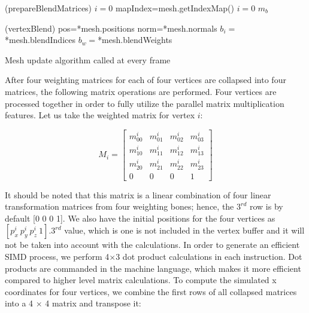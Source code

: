 \begin{algorithm}[ht]
\DontPrintSemicolon %
\function(prepareBlendMatrices){
$i=0$\;
\;
mapIndex=mesh.getIndexMap() 
$i=0$\;
\;
\Return $m_b$\;
}

\function(vertexBlend){
pos=*mesh.positions\;
norm=*mesh.normals\;
$b_i=$*mesh.blendIndices\;
$b_w=$*mesh.blendWeights\;
}
\caption{Mesh update algorithm called at every frame}
\label{algo:updateMesh}
\end{algorithm}

After four weighting matrices for each of four vertices are collapsed into four matrices, the following matrix operations are performed. Four vertices are processed together in order to fully utilize the parallel matrix multiplication features. Let us take the weighted matrix for vertex $i$:

\begin{equation}
M_i=
\begin{bmatrix}
m_{00}^i & m_{01}^i & m_{02}^i & m_{03}^i \\
m_{10}^i & m_{11}^i & m_{12}^i & m_{13}^i \\
m_{20}^i & m_{21}^i & m_{22}^i & m_{23}^i \\
0 & 0 & 0 & 1
\end{bmatrix}
\label{eqn:weighted_matrix_for_i}
\end{equation}

It should be noted that this matrix is a linear combination of four linear transformation matrices from four weighting bones; hence, the $3^{rd}$ row is by default [0 0 0 1]. We also have the initial positions for the four vertices as $[p^i_x \: p^i_y  \: p^i_z  \: 1]$.$3^{rd}$ value, which is one is not included in the vertex buffer and it will not be taken into account with the calculations. In order to generate an efficient SIMD process, we perform 4$\times$3 dot product calculations in each instruction. Dot products are commanded in the machine language, which makes it more efficient compared to higher level matrix calculations. To compute the simulated x coordinates for  four vertices, we combine the first rows of all collapsed matrices into a 4 $\times$ 4 matrix and transpose it:

